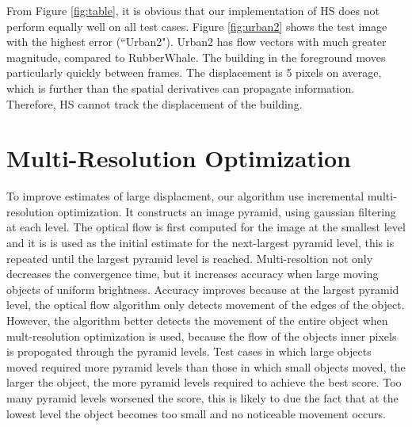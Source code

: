 \documentclass[10pt,twocolumn,letterpaper]{article}
\begin{document}
From Figure \ref{fig:table}, it is obvious that our implementation of HS does not perform equally well on all test cases.  Figure \ref{fig:urban2} shows the test image with the highest error (``Urban2").  Urban2 has flow vectors with much greater magnitude, compared to RubberWhale.  The building in the foreground moves particularly quickly between frames.  The displacement is 5 pixels on average, which is further than the spatial derivatives can propagate information.  Therefore, HS cannot track the displacement of the building.  
\section{Multi-Resolution Optimization}
To improve estimates of large displacment, our algorithm use incremental multi-resolution optimization. It constructs an image pyramid, using gaussian filtering at each level. The optical flow is first computed for the image at the smallest level and it is is used as the initial estimate for the next-largest pyramid level, this is repeated until the largest pyramid level is reached. Multi-resoltion not only decreases the convergence time, but it increases accuracy when large moving objects of uniform brightness. Accuracy improves because at the largest pyramid level, the optical flow algorithm only detects movement of the edges of the object. However, the algorithm better detects the movement of the entire object when mult-resolution optimization is used, because the flow of the objects inner pixels is propogated through the pyramid levels.
Test cases in which large objects moved required more pyramid levels than those in which small objects moved, the larger the object, the more pyramid levels required to achieve the best score. Too many pyramid levels worsened the score, this is likely to due the fact that at the lowest level the object becomes too small and no noticeable movement occurs.
\end{document}

